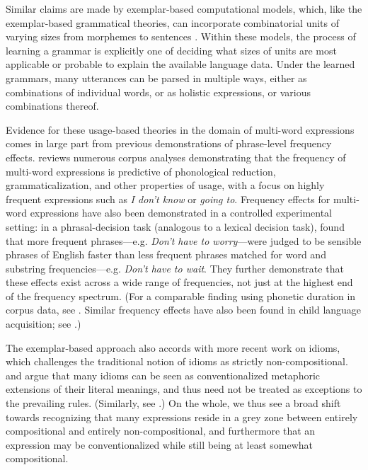 \documentclass[authoryear]{elsarticle}
\begin{document}
Similar claims are made by exemplar-based computational models, which, like the exemplar-based grammatical theories, can incorporate combinatorial units of varying sizes from morphemes to sentences \citep[e.g.][]{Bod:1998tx,Bod:2003uw, Bod:2008uc, Pierrehumbert:2000wh, Johnson:2007wl, ODonnell:2011vh, Post:2013hh}. Within these models, the process of learning a grammar is explicitly one of deciding what sizes of units are most applicable or probable to explain the available language data. Under the learned grammars, many utterances can be parsed in multiple ways, either as combinations of individual words, or as holistic expressions, or various combinations thereof.

Evidence for these usage-based theories in the domain of multi-word expressions comes in large part from previous demonstrations of phrase-level frequency effects. \citet{Bybee:2006ul} reviews numerous corpus analyses demonstrating that the frequency of multi-word expressions is predictive of phonological reduction, grammaticalization, and other properties of usage, with a focus on highly frequent expressions such as \emph{I don't know} or \emph{going to}. Frequency effects for multi-word expressions have also been demonstrated in a controlled experimental setting: in a phrasal-decision task (analogous to a lexical decision task), \citet{Arnon:2010hz} found that more frequent phrases---e.g. \emph{Don't have to worry}---were judged to be sensible phrases of English faster than less frequent phrases matched for word and substring frequencies---e.g. \emph{Don't have to wait}. They further demonstrate that these effects exist across a wide range of frequencies, not just at the highest end of the frequency spectrum. (For a comparable finding using phonetic duration in corpus data, see \citealp{Arnon:2013tr}. Similar frequency effects have also been found in child language acquisition; see \citealp{Bannard:2008bm}.)
	
The exemplar-based approach also accords with more recent work on idioms, which challenges the traditional notion of idioms as strictly non-compositional. \citet{Gibbs:1990wh} and \citet{Nunberg:1994uc} argue that many idioms can be seen as conventionalized metaphoric extensions of their literal meanings, and thus need not be treated as exceptions to the prevailing rules. (Similarly, see \citealp{Holsinger:2013iv}.) On the whole, we thus see a broad shift towards recognizing that many expressions reside in a grey zone between entirely compositional and entirely non-compositional, and furthermore that an expression may be conventionalized while still being at least somewhat compositional.
\end{document}
